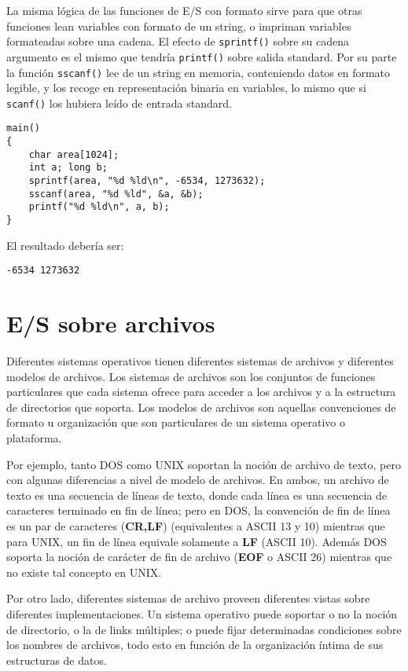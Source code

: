 La misma lógica de las funciones de E/S con formato sirve para que otras
funciones lean variables con formato de un string, o impriman variables
formateadas sobre una cadena. El efecto de \lstinline{sprintf()} sobre su cadena argumento
es el mismo que tendría \lstinline{printf()} sobre salida standard. Por su parte la función 
\lstinline{sscanf()} lee de un string en memoria, conteniendo datos en formato legible, y los
recoge en representación binaria en variables, lo mismo que si \lstinline{scanf()} los
hubiera leído de entrada standard.

\begin{ejemplo}
\begin{lstlisting}
main()
{
    char area[1024];
    int a; long b;
    sprintf(area, "%d %ld\n", -6534, 1273632);
    sscanf(area, "%d %ld", &a, &b);
    printf("%d %ld\n", a, b);
}
\end{lstlisting}

El resultado debería ser:
\begin{lstlisting}
-6534 1273632
\end{lstlisting}
\end{ejemplo}

\section{E/S sobre archivos}
\label{sec:esarchivos}

Diferentes sistemas operativos tienen diferentes sistemas de archivos y
diferentes modelos de archivos. Los sistemas de archivos son los conjuntos de
funciones particulares que cada sistema ofrece para acceder a los archivos y a
la estructura de directorios que soporta. Los modelos de archivos son aquellas
convenciones de formato u organización que son particulares de un sistema
operativo o plataforma.

Por ejemplo, tanto DOS como UNIX soportan la noción de archivo de texto, pero
con algunas diferencias a nivel de modelo de archivos. En ambos, un archivo de
texto es una secuencia de líneas de texto, donde cada línea es una secuencia de
caracteres terminado en fin de línea; pero en DOS, la convención de fin de
línea es un par de caracteres (\textbf{CR,LF}) (equivalentes a ASCII 13 y 10) mientras
que para UNIX, un fin de línea equivale solamente a \textbf{LF} (ASCII 10). Además DOS
soporta la noción de carácter de fin de archivo (\textbf{EOF} o ASCII 26) mientras que
no existe tal concepto en UNIX.

Por otro lado, diferentes sistemas de archivo proveen diferentes vistas sobre
diferentes implementaciones. Un sistema operativo puede soportar o no la noción
de directorio, o la de links múltiples; o puede fijar determinadas condiciones
sobre los nombres de archivos, todo esto en función de la organización íntima
de sus estructuras de datos.

